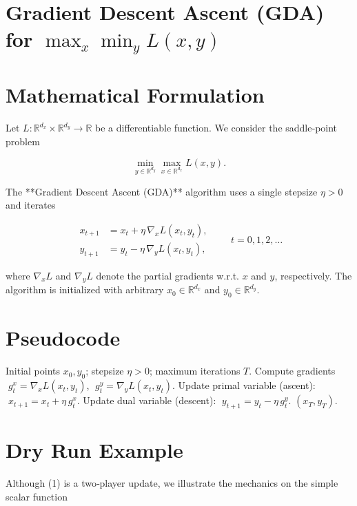 \documentclass{article}
\begin{document}
\section*{Gradient Descent Ascent (GDA) for \(\displaystyle \max_{x}\min_{y}L(x,y)\)}

\section*{Mathematical Formulation}
Let \(L:\mathbb{R}^{d_x}\times\mathbb{R}^{d_y}\rightarrow\mathbb{R}\) be a differentiable function.  
We consider the saddle‑point problem  

\[
\min_{y\in\mathbb{R}^{d_y}}\max_{x\in\mathbb{R}^{d_x}} L(x,y).
\]

The **Gradient Descent Ascent (GDA)** algorithm uses a single stepsize \(\eta>0\) and iterates  

\[
\boxed{
\begin{aligned}
x_{t+1} &= x_{t}+ \eta \,\nabla_{x}L(x_{t},y_{t}),\\[2mm]
y_{t+1} &= y_{t}- \eta \,\nabla_{y}L(x_{t},y_{t}),
\end{aligned}}
\qquad t=0,1,2,\dots
\tag{1}
\]

where \(\nabla_x L\) and \(\nabla_y L\) denote the partial gradients w.r.t. \(x\) and \(y\), respectively.  
The algorithm is initialized with arbitrary \(x_{0}\in\mathbb{R}^{d_x}\) and \(y_{0}\in\mathbb{R}^{d_y}\).  

\section*{Pseudocode}
\begin{algorithm}[H]
\caption{Gradient Descent Ascent (GDA)}\label{alg:GDA}
\begin{algorithmic}[1]
\REQUIRE Initial points \(x_{0},y_{0}\); stepsize \(\eta>0\); maximum iterations \(T\).
    \STATE Compute gradients \(\;g^{x}_{t}= \nabla_{x}L(x_{t},y_{t})\), \(\;g^{y}_{t}= \nabla_{y}L(x_{t},y_{t})\).
    \STATE Update primal variable (ascent): \(\;x_{t+1}=x_{t}+ \eta\, g^{x}_{t}\).
    \STATE Update dual variable (descent): \(\;y_{t+1}=y_{t}- \eta\, g^{y}_{t}\).
\ENDFOR
\RETURN \((x_{T},y_{T})\).
\end{algorithmic}
\end{algorithm}

\section*{Dry Run Example}
Although (1) is a two‑player update, we illustrate the mechanics on the simple scalar function  
\end{document}
